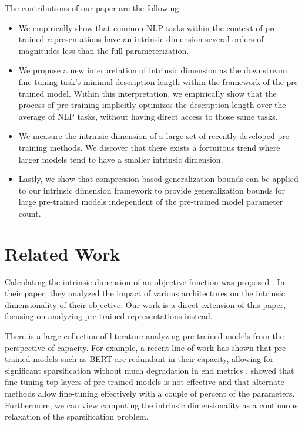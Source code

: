 \documentclass{article} %
\begin{document}
The contributions of our paper are the following:
\begin{itemize}
    \item We empirically show that common NLP tasks within the context of pre-trained representations have an intrinsic dimension several orders of magnitudes less than the full parameterization.
    \item We propose a new interpretation of intrinsic dimension as the downstream fine-tuning task's minimal description length within the framework of the pre-trained model. Within this interpretation, we empirically show that the process of pre-training implicitly optimizes the description length over the average of NLP tasks, without having direct access to those same tasks.
    \item We measure the intrinsic dimension of a large set of recently developed pre-training methods. We discover that there exists a  fortuitous trend where larger models tend to have a smaller intrinsic dimension.
    \item Lastly, we show that compression based generalization bounds can be applied to our intrinsic dimension framework to provide generalization bounds for large pre-trained models independent of the pre-trained model parameter count.
\end{itemize}


\section{Related Work}
Calculating the intrinsic dimension of an objective function was proposed \cite{intrinsic_dimension}. In their paper, they analyzed the impact of various architectures on the intrinsic dimensionality of their objective. Our work is a direct extension of this paper, focusing on analyzing pre-trained representations instead.

There is a large collection of literature analyzing pre-trained models from the perspective of capacity. For example, a recent line of work has shown that pre-trained models such as BERT are redundant in their capacity, allowing for significant sparsification without much degradation in end metrics \citep{bert_lottery_ticket, bert_lottery_all_winners, hongyuan_lotter_ticket}. \cite{adapter_network} showed that fine-tuning top layers of pre-trained models is not effective and that alternate methods allow fine-tuning effectively with a couple of percent of the parameters. Furthermore, we can view computing the intrinsic dimensionality as a continuous relaxation of the sparsification problem.
\end{document}
